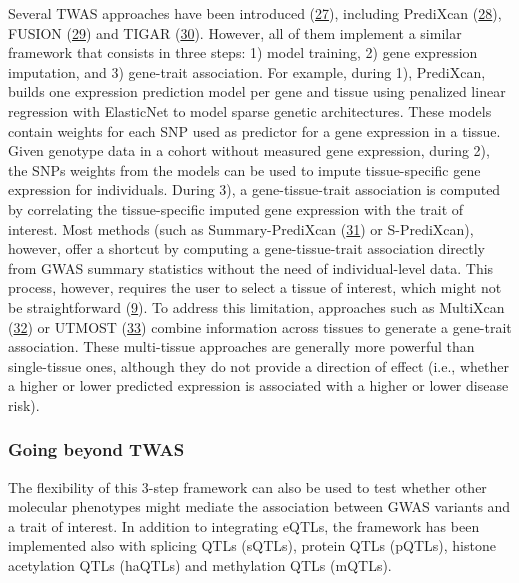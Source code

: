 Several TWAS approaches have been introduced (\protect\hyperlink{ref-RmhTH35O}{27}), including PrediXcan (\protect\hyperlink{ref-Z8bvDdVq}{28}), FUSION (\protect\hyperlink{ref-1D63fEEPb}{29}) and TIGAR (\protect\hyperlink{ref-19Klmizj8}{30}).
However, all of them implement a similar framework that consists in three steps: 1) model training, 2) gene expression imputation, and 3) gene-trait association.
For example, during 1), PrediXcan, builds one expression prediction model per gene and tissue using penalized linear regression with ElasticNet to model sparse genetic architectures.
These models contain weights for each SNP used as predictor for a gene expression in a tissue.
Given genotype data in a cohort without measured gene expression, during 2), the SNPs weights from the models can be used to impute tissue-specific gene expression for individuals.
During 3), a gene-tissue-trait association is computed by correlating the tissue-specific imputed gene expression with the trait of interest.
Most methods (such as Summary-PrediXcan (\protect\hyperlink{ref-vLyTudUB}{31}) or S-PrediXcan), however, offer a shortcut by computing a gene-tissue-trait association directly from GWAS summary statistics without the need of individual-level data.
This process, however, requires the user to select a tissue of interest, which might not be straightforward (\protect\hyperlink{ref-l6ogswV3}{9}).
To address this limitation, approaches such as MultiXcan (\protect\hyperlink{ref-1FFzCXo1s}{32}) or UTMOST (\protect\hyperlink{ref-93R9hBin}{33}) combine information across tissues to generate a gene-trait association.
These multi-tissue approaches are generally more powerful than single-tissue ones, although they do not provide a direction of effect (i.e., whether a higher or lower predicted expression is associated with a higher or lower disease risk).

\hypertarget{going-beyond-twas}{%
\subsubsection{Going beyond TWAS}\label{going-beyond-twas}}

The flexibility of this 3-step framework can also be used to test whether other molecular phenotypes might mediate the association between GWAS variants and a trait of interest.
In addition to integrating eQTLs, the framework has been implemented also with splicing QTLs (sQTLs), protein QTLs (pQTLs), histone acetylation QTLs (haQTLs) and methylation QTLs (mQTLs).

